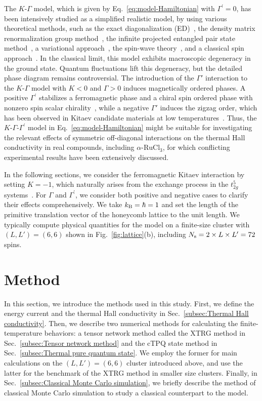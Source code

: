 \documentclass[twocolumn,superscriptaddress,showpacs, longbibliography, aps, prx]{revtex4-2}
\begin{document}
The $K$-$\Gamma$ model, which is given by Eq.~\eqref{eq:model-Hamiltonian} with $\Gamma^\prime=0$, has been intensively studied as a simplified realistic model, by using various theoretical methods, such as the exact diagonalization (ED)~\cite{catuneanu2018,Yamada2020}, the density matrix renormalization group method~\cite{Gohlke_PRB2018}, the infinite projected entangled pair state method~\cite{Lee_NCom2020,ZhangLLLW2023}, a variational approach~\cite{Zhang2021}, the spin-wave theory~\cite{Smit2020}, and a classical spin approach~\cite{Rayyan2021}.
In the classical limit, this model exhibits macroscopic degeneracy in the ground state. 
Quantum fluctuations lift this degeneracy, but the detailed phase diagram remains controversial.
The introduction of the $\Gamma'$ interaction to the $K$-$\Gamma$ model with $K<0$ and $\Gamma>0$ induces magnetically ordered phases. 
A positive $\Gamma^\prime$ stabilizes a ferromagnetic phase and a chiral spin ordered phase with nonzero spin scalar chirality~\cite{Luo2022PRR,Luo2022}, 
while a negative $\Gamma'$ induces the zigzag order, which has been observed in Kitaev candidate materials at low temperatures~\cite{Rusna2019,gordon2019theory,Chern2020,Lee_NCom2020}. 
Thus, the $K$-$\Gamma$-$\Gamma^\prime$ model in Eq.~\eqref{eq:model-Hamiltonian} might be suitable for investigating the relevant effects of symmetric off-diagonal interactions on the thermal Hall conductivity in real compounds, including $\alpha$-$\mathrm{RuCl_3}$, for which conflicting experimental results have been extensively discussed.

In the following sections, we consider the ferromagnetic Kitaev interaction by setting $K= -1$, which naturally arises from the exchange process in the $t_{2g}^5$ systems{~\cite{Jackeli_PRL2009}}. 
For $\Gamma$ and $\Gamma^\prime$, we consider both positive and negative cases to clarify their effects comprehensively. We take $k_{\rm B} = \hbar = 1$ and set the length of the primitive translation vector of the honeycomb lattice to the unit length.
We typically compute physical quantities for the model on a finite-size cluster with $(L, L') = (6, 6)$ shown in Fig.~\ref{fig:lattice}(b), including $N_{\rm s}=2\times L\times L^{\prime} =72$ spins.

\section{Method}
\label{sec:method}
In this section, we introduce the methods used in this study. 
First, we define the energy current and the thermal Hall conductivity in Sec.~\ref{subsec:Thermal Hall conductivity}. 
Then, we describe two numerical methods for calculating the finite-temperature behaviors: a tensor network method called the XTRG method in Sec.~\ref{subsec:Tensor network method} and the cTPQ state method in Sec.~\ref{subsec:Thermal pure quantum state}. 
We employ the former for main calculations on the $(L, L') = (6, 6)$ cluster introduced above, and use the latter for the benchmark of the XTRG method in smaller size clusters.
Finally, in Sec.~\ref{subsec:Classical Monte Carlo simulation}, we briefly describe the method of classical Monte Carlo simulation to study a classical counterpart to the model.
\end{document}
